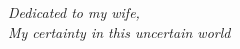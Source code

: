 \thispagestyle{empty}
\vspace*{\fill}
\begin{center}
    \itshape
    Dedicated to my wife,\\[0.4em]
    My certainty in this uncertain world\\[0.2em]
\end{center}
\vspace*{\fill}
\clearpage
